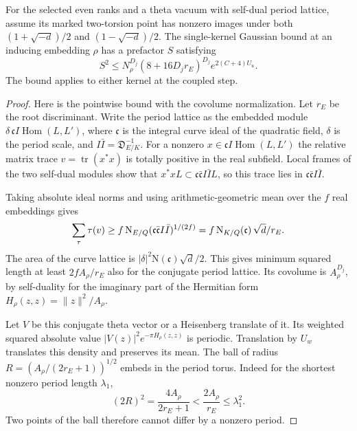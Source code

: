 \begin{lemma}\label{lem:conjugate-jet-prefactor}
For the selected even ranks and a theta vacuum with self-dual
period lattice, assume its marked two-torsion point has nonzero
images under both \((1+\sqrt{-d})/2\) and \((1-\sqrt{-d})/2\).
The single-kernel Gaussian bound at an inducing embedding \(\rho\)
has a prefactor \(S\) satisfying
\[
 S^2\le N_\rho^{D_j}(8+16D_jr_E)^{D_j} e^{2(C+4)U_u}.
\]
The bound applies to either kernel at the coupled step.
\end{lemma}

\begin{proof}
Here is the pointwise bound with the covolume normalization.
Let \(r_E\) be the root discriminant. Write the period
lattice as the embedded module
\(\delta\,\mathfrak c I\operatorname{Hom}(L,L')\),
where \(\mathfrak c\) is the integral curve ideal of the
quadratic field, \(\delta\) is the period scale, and
\(I\bar I=\mathfrak D_{E/K}^{-1}\).
For a nonzero \(x\in\mathfrak c I\operatorname{Hom}(L,L')\)
the relative matrix trace \(v=\operatorname{tr}(x^*x)\)
is totally positive in the real subfield. Local frames
of the two self-dual modules show that
\(x^*x L\subset \mathfrak c\bar{\mathfrak c}I\bar I L\),
so this trace lies in
\(\mathfrak c\bar{\mathfrak c}I\bar I\).

Taking absolute ideal norms and using arithmetic-geometric
mean over the \(f\) real embeddings gives
\[
 \sum_\tau \tau(v)
    \ge f\,\mathrm N_{E/Q}
                 (\mathfrak c\bar{\mathfrak c}I\bar I)^{1/(2f)}
    = f\,\mathrm N_{K/Q}(\mathfrak c)\,\sqrt d/r_E .
\]
The area of the curve lattice is
\(|\delta|^2\mathrm N(\mathfrak c)\sqrt d/2\).
This gives minimum squared length at least
\(2f A_\rho/r_E\) also for the conjugate period lattice.
Its covolume is \(A_\rho^{D_j}\), by self-duality for
the imaginary part of the Hermitian form
\(H_\rho(z,z)=\|z\|^2/A_\rho\).

Let \(V\) be this conjugate theta vector or a Heisenberg
translate of it. Its weighted squared absolute value
\(|V(z)|^2 e^{-\pi H_\rho(z,z)}\) is periodic.
Translation by \(U_w\) translates this density and preserves
its mean. The ball of radius
\(R=(A_\rho/(2r_E+1))^{1/2}\) embeds in the period torus. Indeed for the shortest nonzero
period length \(\lambda_1\),
\[
 (2R)^2=\frac{4A_\rho}{2r_E+1}
    <\frac{2A_\rho}{r_E}\le\lambda_1^2 .
\]
Two points of the ball therefore cannot differ by a nonzero period.


\end{proof}
